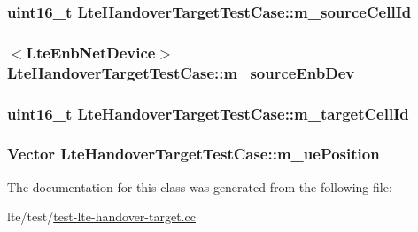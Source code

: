 \subsubsection[{\texorpdfstring{m\+\_\+source\+Cell\+Id}{m_sourceCellId}}]{\setlength{\rightskip}{0pt plus 5cm}uint16\+\_\+t Lte\+Handover\+Target\+Test\+Case\+::m\+\_\+source\+Cell\+Id\hspace{0.3cm}{\ttfamily [private]}}\hypertarget{classLteHandoverTargetTestCase_aa919cf50724c078e53ca949f381d8b8a}{}\label{classLteHandoverTargetTestCase_aa919cf50724c078e53ca949f381d8b8a}
\subsubsection[{\texorpdfstring{m\+\_\+source\+Enb\+Dev}{m_sourceEnbDev}}]{$<${\bf Lte\+Enb\+Net\+Device}$>$ Lte\+Handover\+Target\+Test\+Case\+::m\+\_\+source\+Enb\+Dev\hspace{0.3cm}{\ttfamily [private]}}\hypertarget{classLteHandoverTargetTestCase_a1aff8bd42d4c6475f92ca6dfe92d56a6}{}\label{classLteHandoverTargetTestCase_a1aff8bd42d4c6475f92ca6dfe92d56a6}
\subsubsection[{\texorpdfstring{m\+\_\+target\+Cell\+Id}{m_targetCellId}}]{\setlength{\rightskip}{0pt plus 5cm}uint16\+\_\+t Lte\+Handover\+Target\+Test\+Case\+::m\+\_\+target\+Cell\+Id\hspace{0.3cm}{\ttfamily [private]}}\hypertarget{classLteHandoverTargetTestCase_adaf3b92375a8c58e00ff625af6f5a218}{}\label{classLteHandoverTargetTestCase_adaf3b92375a8c58e00ff625af6f5a218}
\subsubsection[{\texorpdfstring{m\+\_\+ue\+Position}{m_uePosition}}]{\setlength{\rightskip}{0pt plus 5cm}Vector Lte\+Handover\+Target\+Test\+Case\+::m\+\_\+ue\+Position\hspace{0.3cm}{\ttfamily [private]}}\hypertarget{classLteHandoverTargetTestCase_aba4c81ee775bfd5ea7731bd9663b4d58}{}\label{classLteHandoverTargetTestCase_aba4c81ee775bfd5ea7731bd9663b4d58}


The documentation for this class was generated from the following file\+:\begin{DoxyCompactItemize}
\item 
lte/test/\hyperlink{test-lte-handover-target_8cc}{test-\/lte-\/handover-\/target.\+cc}\end{DoxyCompactItemize}
